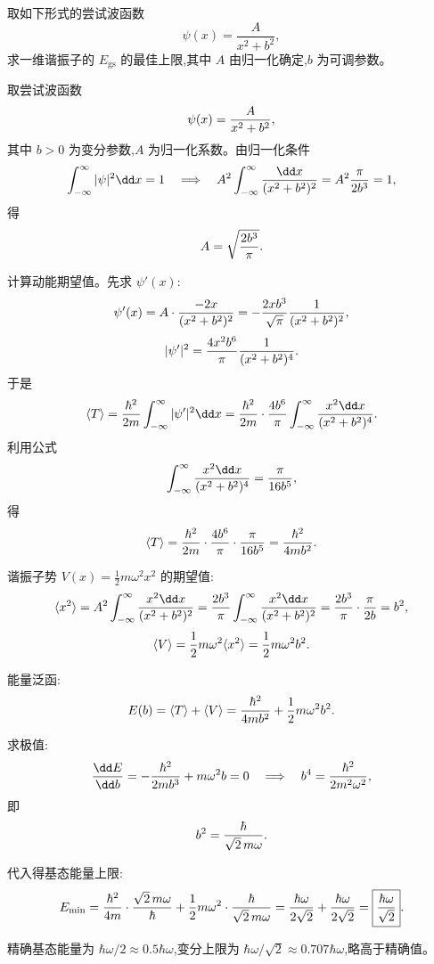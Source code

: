 \begin{question}
取如下形式的尝试波函数
\[
\psi(x)=\frac{A}{x^2+b^2},
\]
求一维谐振子的 $E_{\mathrm{gs}}$ 的最佳上限,其中 $A$ 由归一化确定,$b$ 为可调参数。
\begin{solution}
取尝试波函数
\[
\psi(x)={A\over x^2+b^2},
\]
其中 $b>0$ 为变分参数,$A$ 为归一化系数。由归一化条件
\[
\int_{-\infty}^{\infty}|\psi|^2\dd x=1
\quad\Longrightarrow\quad
A^2\int_{-\infty}^{\infty}{\dd x\over(x^2+b^2)^2}=A^2{\pi\over2b^3}=1,
\]
得
\[
A=\sqrt{2b^3\over\pi}.
\]

计算动能期望值。先求 $\psi'(x)$:
\[
\psi'(x)=A\cdot{-2x\over(x^2+b^2)^2}
=-{2xb^3\over\sqrt{\pi}}{1\over(x^2+b^2)^2},
\]
\[
|\psi'|^2={4x^2b^6\over\pi}{1\over(x^2+b^2)^4}.
\]
于是
\[
\langle T\rangle={\hbar^2\over2m}\int_{-\infty}^{\infty}|\psi'|^2\dd x
={\hbar^2\over2m}\cdot{4b^6\over\pi}\int_{-\infty}^{\infty}{x^2\dd x\over(x^2+b^2)^4}.
\]
利用公式
\[
\int_{-\infty}^{\infty}{x^2\dd x\over(x^2+b^2)^4}={\pi\over16b^5},
\]
得
\[
\langle T\rangle={\hbar^2\over2m}\cdot{4b^6\over\pi}\cdot{\pi\over16b^5}
={\hbar^2\over4mb^2}.
\]

谐振子势 $V(x)=\frac12m\omega^2x^2$ 的期望值:
\[
\langle x^2\rangle = A^2\int_{-\infty}^{\infty}{x^2\dd x\over(x^2+b^2)^2}
={2b^3\over\pi}\int_{-\infty}^{\infty}{x^2\dd x\over(x^2+b^2)^2}
={2b^3\over\pi}\cdot{\pi\over2b}=b^2,
\]
\[
\langle V\rangle={1\over2}m\omega^2\langle x^2\rangle={1\over2}m\omega^2b^2.
\]

能量泛函:
\[
E(b)=\langle T\rangle+\langle V\rangle
={\hbar^2\over4mb^2}+{1\over2}m\omega^2b^2.
\]

求极值:
\[
{\dd E\over\dd b}=-{\hbar^2\over2mb^3}+m\omega^2b=0
\quad\Longrightarrow\quad
b^4={\hbar^2\over2m^2\omega^2},
\]
即
\[
b^2={\hbar\over\sqrt2\,m\omega}.
\]

代入得基态能量上限:
\[
E_{\min}={\hbar^2\over4m}\cdot{\sqrt2\,m\omega\over\hbar}
+{1\over2}m\omega^2\cdot{\hbar\over\sqrt2\,m\omega}
={\hbar\omega\over2\sqrt2}+{\hbar\omega\over2\sqrt2}
=\boxed{{\hbar\omega\over\sqrt2}}.
\]

精确基态能量为 $\hbar\omega/2\approx0.5\hbar\omega$,变分上限为 $\hbar\omega/\sqrt2\approx0.707\hbar\omega$,略高于精确值。
\end{solution}
\end{question}

